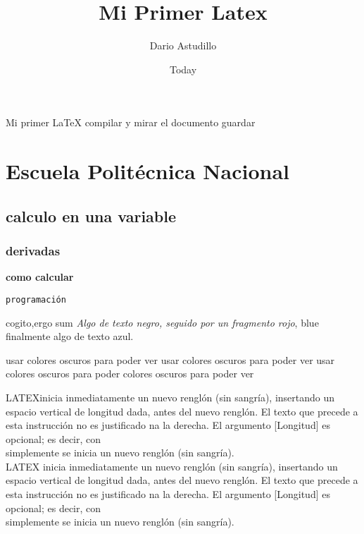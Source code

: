 \documentclass[a4paper,onecolumn,12pt]{article}
\author{Dario Astudillo }
\title{Mi Primer Latex}
\date{Today}
\begin{document}
	\maketitle

	Mi primer  LaTeX
	compilar y mirar el documento
	guardar
	\section[epn]{Escuela Politécnica Nacional}
	\subsection{calculo en una variable}
	\subsubsection{derivadas}
	\textbf{como calcular }
	
	\texttt{programación}
	
	{\normalsize cogito,ergo sum}
	\emph{Algo de texto negro, \color{red}
seguido por un fragmento rojo}, {\color
{blue} finalmente algo de texto azul.}
 
   usar colores  oscuros para poder ver 
   usar colores  oscuros para poder ver usar colores 
    oscuros      para poder   colores  oscuros para poder ver
     
   \qquad  LATEX\qquad inicia inmediatamente un nuevo renglón (sin sangría), insertando un espacio
vertical de longitud dada, antes del nuevo renglón. El texto que precede a esta instrucción
no es justificado na la derecha. El argumento [Longitud] es opcional; es decir, con \\ simplemente
se inicia un nuevo renglón (sin sangría).
\\[10mm]
   LATEX inicia inmediatamente un nuevo renglón (sin sangría), insertando un espacio
vertical de longitud dada, antes del nuevo renglón. El texto que precede a esta instrucción
no es justificado na la derecha. El argumento [Longitud] es opcional; es decir, con \\ simplemente
se inicia un nuevo renglón (sin sangría).
\\[10mm]
 
\end{document}
